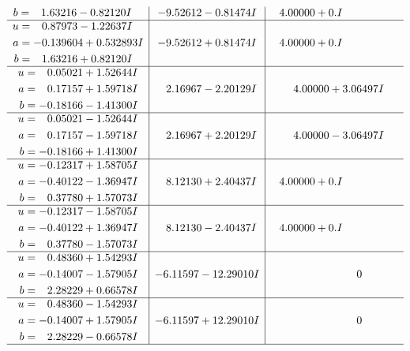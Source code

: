 \documentclass[1p]{elsarticle_modified}
\theoremstyle{definition}
\begin{document}
$$\begin{array}{c|c|c}
\begin{aligned}
b &= \phantom{-}1.63216 - 0.82120 I\end{aligned}
 & -9.52612 - 0.81474 I & \phantom{-}4.00000 + 0. I\phantom{ +0.000000I} \\ \hline\begin{aligned}
u &= \phantom{-}0.87973 - 1.22637 I \\
a &= -0.139604 + 0.532893 I \\
b &= \phantom{-}1.63216 + 0.82120 I\end{aligned}
 & -9.52612 + 0.81474 I & \phantom{-}4.00000 + 0. I\phantom{ +0.000000I} \\ \hline\begin{aligned}
u &= \phantom{-}0.05021 + 1.52644 I \\
a &= \phantom{-}0.17157 + 1.59718 I \\
b &= -0.18166 - 1.41300 I\end{aligned}
 & \phantom{-}2.16967 - 2.20129 I & \phantom{-}4.00000 + 3.06497 I \\ \hline\begin{aligned}
u &= \phantom{-}0.05021 - 1.52644 I \\
a &= \phantom{-}0.17157 - 1.59718 I \\
b &= -0.18166 + 1.41300 I\end{aligned}
 & \phantom{-}2.16967 + 2.20129 I & \phantom{-}4.00000 - 3.06497 I \\ \hline\begin{aligned}
u &= -0.12317 + 1.58705 I \\
a &= -0.40122 - 1.36947 I \\
b &= \phantom{-}0.37780 + 1.57073 I\end{aligned}
 & \phantom{-}8.12130 + 2.40437 I & \phantom{-}4.00000 + 0. I\phantom{ +0.000000I} \\ \hline\begin{aligned}
u &= -0.12317 - 1.58705 I \\
a &= -0.40122 + 1.36947 I \\
b &= \phantom{-}0.37780 - 1.57073 I\end{aligned}
 & \phantom{-}8.12130 - 2.40437 I & \phantom{-}4.00000 + 0. I\phantom{ +0.000000I} \\ \hline\begin{aligned}
u &= \phantom{-}0.48360 + 1.54293 I \\
a &= -0.14007 - 1.57905 I \\
b &= \phantom{-}2.28229 + 0.66578 I\end{aligned}
 & -6.11597 - 12.29010 I & \phantom{-0.000000 } 0 \\ \hline\begin{aligned}
u &= \phantom{-}0.48360 - 1.54293 I \\
a &= -0.14007 + 1.57905 I \\
b &= \phantom{-}2.28229 - 0.66578 I\end{aligned}
 & -6.11597 + 12.29010 I & \phantom{-0.000000 } 0\\
 \hline 
 \end{array}$$\newpage\newpage\renewcommand{\arraystretch}{1}
\end{document}
